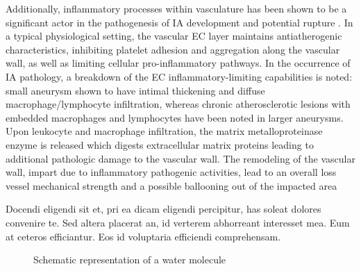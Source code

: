 Additionally, inflammatory processes within vasculature has been shown to be a significant actor in the pathogenesis of IA development and potential rupture \cite{chalouhi2012biology,hashimoto2006,signorelli2018}. In a typical physiological setting, the vascular EC layer maintains antiatherogenic characteristics, inhibiting platelet adhesion and aggregation along the vascular wall, as well as limiting cellular pro-inflammatory pathways\cite{ALSOUDI2017951}. In the occurrence of IA pathology, a breakdown of the EC inflammatory-limiting capabilities is noted: small aneurysm shown to have intimal thickening and diffuse macrophage/lymphocyte infiltration, whereas chronic atherosclerotic lesions with embedded macrophages and lymphocytes have been noted in larger aneurysms\cite{Frösen2012,kosierkiewicz1994}. Upon leukocyte and macrophage infiltration, the matrix metalloproteinase enzyme is released which digests extracellular matrix proteins leading to additional pathologic damage to the vascular wall\cite{tronic2000,aoki2007a}. The remodeling of the vascular wall, impart due to inflammatory pathogenic activities, lead to an overall loss vessel mechanical strength and a possible ballooning out of the impacted area   



Docendi eligendi sit et, pri ea dicam eligendi percipitur, has soleat 
dolores convenire te. Sed altera placerat an, id verterem abhorreant 
interesset mea. Eum at ceteros efficiantur. Eos id voluptaria efficiendi 
comprehensam. \cite{HPL_DGEMM_01,HPL_DGEMM_02}

\begin{figure}[hbt]
  \begin{center}
  \end{center}
  \caption{Schematic representation of a water molecule}
  \label{CHAPTER1_FIG03}
\end{figure}

